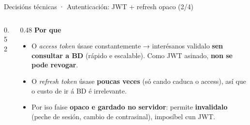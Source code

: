 \documentclass[11pt,aspectratio=169]{beamer}
\begin{document}
\begin{frame}{Decisións técnicas · Autenticación: JWT + refresh opaco (2/4)}
  \begin{columns}[c]
    \begin{column}{0.52\textwidth}
      \centering
    \end{column}
    \begin{column}{0.48\textwidth}
      \textbf{Por que}
      \begin{itemize}\small
        \item O \textit{access token} úsase constantemente → interésanos validalo \textbf{sen consultar a BD} (rápido e escalable). Como JWT asinado, \textbf{non se pode revogar}.
        \item O \textit{refresh token} úsase \textbf{poucas veces} (só cando caduca o access), así que o custo de ir á BD é irrelevante.
        \item Por iso faise \textbf{opaco e gardado no servidor}: permite \textbf{invalidalo} (peche de sesión, cambio de contrasinal), imposíbel cun JWT.
      \end{itemize}
    \end{column}
  \end{columns}
\end{frame}
\end{document}
